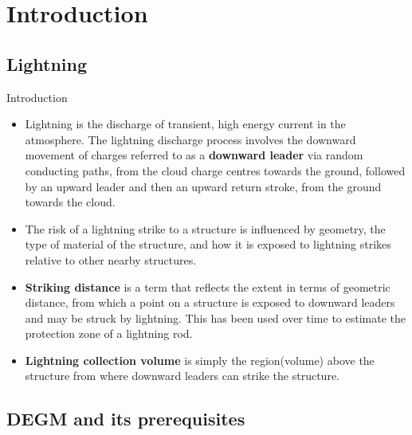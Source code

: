 \documentclass{beamer}
\begin{document}
\section{Introduction}
\subsection{Lightning}
\begin{frame}{Introduction}
    \begin{itemize}
        \justifying
        \item Lightning is the discharge of transient, high energy current in the atmosphere. The lightning discharge process involves the downward movement of charges referred to as a \textbf{downward leader} via random conducting paths, from the cloud charge centres towards the ground, followed by an upward leader and then an upward return stroke, from the ground towards the cloud.
        \item The risk of a lightning strike to a structure is influenced by geometry, the type of material of the structure, and how it is exposed to lightning strikes relative to other nearby structures.
        \item \textbf{Striking distance} is a term that reflects the extent in terms of geometric distance, from which a point on a structure is exposed to downward leaders and may be struck by lightning. This has been used over time to estimate the protection zone of a lightning rod.
        \item \textbf{Lightning collection volume} is simply the region(volume) above the structure from where downward leaders can strike the structure.
    \end{itemize}
\end{frame}

\subsection{DEGM and its prerequisites}
\end{document}
